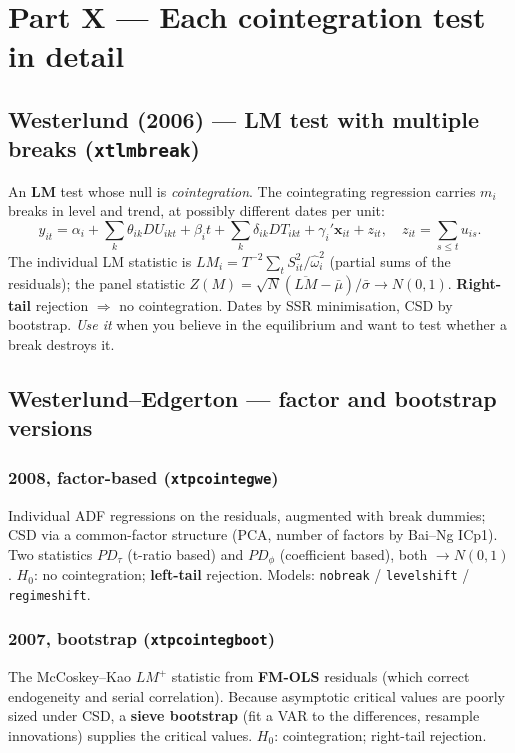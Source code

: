 \documentclass[11pt,a4paper]{article}
\newcommand{\cmd}[1]{\texttt{\textcolor{camber}{#1}}}
\newcommand{\hlt}[2]{\textcolor{#1}{\textbf{#2}}}
\newcommand{\bx}{\mathbf{x}}
\theoremstyle{definition}
\begin{document}
\section{Part X --- Each cointegration test in detail}

\subsection{Westerlund (2006) --- LM test with multiple breaks (\cmd{xtlmbreak})}
An \hlt{cblue}{LM} test whose null is \emph{cointegration}. The cointegrating regression carries
$m_i$ breaks in level and trend, at possibly different dates per unit:
\[
y_{it}=\alpha_i+\textstyle\sum_k\theta_{ik}DU_{ikt}+\beta_i t+\sum_k\delta_{ik}DT_{ikt}+\gamma_i'\bx_{it}+z_{it},
\quad z_{it}=\textstyle\sum_{s\le t}u_{is}.
\]
The individual LM statistic is $LM_i=T^{-2}\sum_t S_{it}^2/\hat\omega_i^2$ (partial sums of the
residuals); the panel statistic $Z(M)=\sqrt N(\overline{LM}-\bar\mu)/\bar\sigma\to N(0,1)$.
\hlt{cred}{Right-tail} rejection $\Rightarrow$ no cointegration. Dates by SSR minimisation, CSD by
bootstrap. \emph{Use it} when you believe in the equilibrium and want to test whether a break
destroys it.

\subsection{Westerlund--Edgerton --- factor and bootstrap versions}
\subsubsection{2008, factor-based (\cmd{xtpcointegwe})}
Individual ADF regressions on the residuals, augmented with break dummies; CSD via a common-factor
structure (PCA, number of factors by Bai--Ng ICp1). Two statistics $PD_\tau$ (t-ratio based) and
$PD_\phi$ (coefficient based), both $\to N(0,1)$. $H_0$: no cointegration; \hlt{cred}{left-tail}
rejection. Models: \cmd{nobreak} / \cmd{levelshift} / \cmd{regimeshift}.
\subsubsection{2007, bootstrap (\cmd{xtpcointegboot})}
The McCoskey--Kao $LM^+$ statistic from \hlt{cblue}{FM-OLS} residuals (which correct endogeneity and
serial correlation). Because asymptotic critical values are poorly sized under CSD, a
\hlt{cblue}{sieve bootstrap} (fit a VAR to the differences, resample innovations) supplies the
critical values. $H_0$: cointegration; right-tail rejection.
\end{document}
